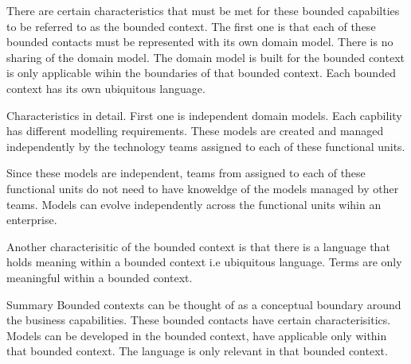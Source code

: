 \documentclass[a4paper, 11pt]{book}
\begin{document}
    There are certain characteristics that must be met for these bounded capabilties to be referred to as the bounded context.
    The first one is that each of these bounded contacts must be represented with its own domain model.
    There is no sharing of the domain model.
    The domain model is built for the bounded context is only applicable wihin the boundaries of that bounded context.
    Each bounded context has its own ubiquitous language.

    Characteristics in detail.
    First one is independent domain models.
    Each capbility has different modelling requirements.
    These models are created and managed independently by the technology teams assigned to each of these functional units.

    Since these models are independent, teams from assigned to each of these functional units do not need to have knoweldge of the models managed by other teams.
    Models can evolve independently across the functional units wihin an enterprise.

    Another characterisitic of the bounded context is that there is a language that holds meaning within a bounded context i.e ubiquitous language.
    Terms are only meaningful within a bounded context.

    Summary
    Bounded contexts can be thought of as a conceptual boundary around the business capabilities.
    These bounded contacts have certain characterisitics.
    Models can be developed in the bounded context, have applicable only within that bounded context.
    The language is only relevant in that bounded context.
\end{document}
